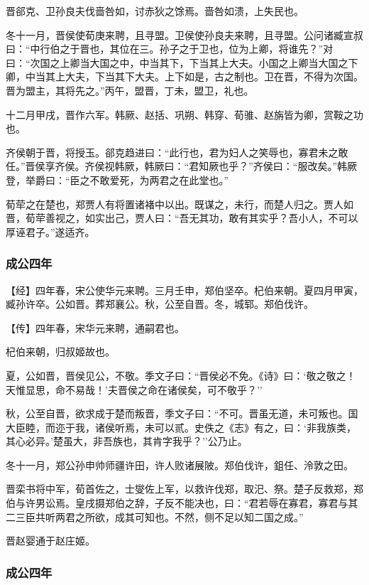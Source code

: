 \documentclass[]{article}
\begin{document}
晋郤克、卫孙良夫伐啬咎如，讨赤狄之馀焉。啬咎如溃，上失民也。

冬十一月，晋侯使荀庚来聘，且寻盟。卫侯使孙良夫来聘，且寻盟。公问诸臧宣叔曰：``中行伯之于晋也，其位在三。孙子之于卫也，位为上卿，将谁先？''对曰：``次国之上卿当大国之中，中当其下，下当其上大夫。小国之上卿当大国之下卿，中当其上大夫，下当其下大夫。上下如是，古之制也。卫在晋，不得为次国。晋为盟主，其将先之。''丙午，盟晋，丁未，盟卫，礼也。

十二月甲戌，晋作六军。韩厥、赵括、巩朔、韩穿、荀骓、赵旃皆为卿，赏鞍之功也。

齐侯朝于晋，将授玉。郤克趋进曰：``此行也，君为妇人之笑辱也，寡君未之敢任。''晋侯享齐侯。齐侯视韩厥，韩厥曰：``君知厥也乎？''齐侯曰：``服改矣。''韩厥登，举爵曰：``臣之不敢爱死，为两君之在此堂也。''

荀荦之在楚也，郑贾人有将置诸褚中以出。既谋之，未行，而楚人归之。贾人如晋，荀荦善视之，如实出己，贾人曰：``吾无其功，敢有其实乎？吾小人，不可以厚诬君子。''遂适齐。

\hypertarget{header-n1562}{%
\subsubsection{成公四年}\label{header-n1562}}

【经】四年春，宋公使华元来聘。三月壬申，郑伯坚卒。杞伯来朝。夏四月甲寅，臧孙许卒。公如晋。葬郑襄公。秋，公至自晋。冬，城郓。郑伯伐许。

【传】四年春，宋华元来聘，通嗣君也。

杞伯来朝，归叔姬故也。

夏，公如晋，晋侯见公，不敬。季文子曰：``晋侯必不免。《诗》曰：`敬之敬之！天惟显思，命不易哉！'夫晋侯之命在诸侯矣，可不敬乎？''

秋，公至自晋，欲求成于楚而叛晋，季文子曰：``不可。晋虽无道，未可叛也。国大臣睦，而迩于我，诸侯听焉，未可以贰。史佚之《志》有之，曰：`非我族类，其心必异。'楚虽大，非吾族也，其肯字我乎？''公乃止。

冬十一月，郑公孙申帅师疆许田，许人败诸展陂。郑伯伐许，鉏任、泠敦之田。

晋栾书将中军，荀首佐之，士燮佐上军，以救许伐郑，取汜、祭。楚子反救郑，郑伯与许男讼焉。皇戌摄郑伯之辞，子反不能决也，曰：``君若辱在寡君，寡君与其二三臣共听两君之所欲，成其可知也。不然，侧不足以知二国之成。''

晋赵婴通于赵庄姬。

\hypertarget{header-n1573}{%
\subsubsection{成公四年}\label{header-n1573}}
\end{document}
